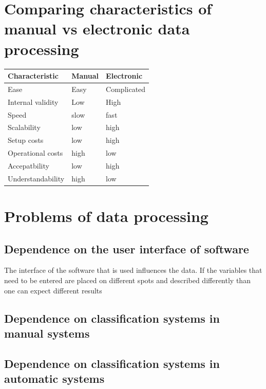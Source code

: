 \documentclass[
  letterpaper,
  DIV=11,
  numbers=noendperiod]{scrreprt}
\begin{document}
\section{Comparing characteristics of manual vs electronic data
processing}\label{comparing-characteristics-of-manual-vs-electronic-data-processing}

\begin{longtable}[]{@{}lll@{}}
\toprule\noalign{}
Characteristic & Manual & Electronic \\
\midrule\noalign{}
\endhead
\bottomrule\noalign{}
\endlastfoot
Ease & Easy & Complicated \\
Internal validity & Low & High \\
Speed & slow & fast \\
Scalability & low & high \\
Setup costs & low & high \\
Operational costs & high & low \\
Accepatbility & low & high \\
Understandability & high & low \\
\end{longtable}

\section{Problems of data processing}\label{problems-of-data-processing}

\subsection{Dependence on the user interface of
software}\label{dependence-on-the-user-interface-of-software}

The interface of the software that is used influences the data. If the
variables that need to be entered are placed on different spots and
described differently than one can expect different results

\subsection{Dependence on classification systems in manual
systems}\label{dependence-on-classification-systems-in-manual-systems}

\subsection{Dependence on classification systems in automatic
systems}\label{dependence-on-classification-systems-in-automatic-systems}
\end{document}
